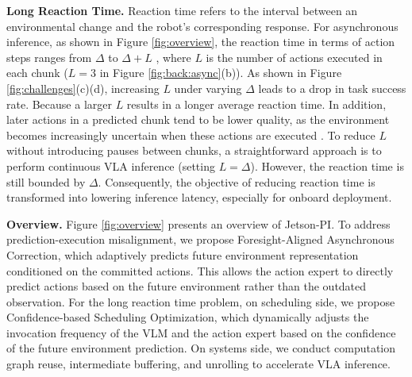 \textbf{Long Reaction Time.}
Reaction time refers to the interval between an environmental change and the robot's corresponding response. For asynchronous inference, as shown in Figure \ref{fig:overview}, the reaction time in terms of action steps ranges from $\Delta$ to $\Delta+L$ \cite{lu2026faster,shi2026streamingvla}, where 
$L$ is the number of actions executed in each chunk ($L=3$ in Figure \ref{fig:back:async}(b)). As shown in Figure \ref{fig:challenges}(c)(d), increasing $L$ under varying $\Delta$ leads to a drop in task success rate. Because a larger $L$ results in a longer average reaction time. 
In addition, later actions in a predicted chunk tend to be lower quality, as the environment becomes increasingly uncertain when these actions are executed \cite{lu2026faster}. 
To reduce $L$ without introducing pauses between chunks, a straightforward approach is to perform continuous VLA inference (setting $L=\Delta$). However, the reaction time is still bounded by $\Delta$. 
Consequently, the objective of reducing reaction time is transformed into lowering inference latency, especially for onboard deployment.



\textbf{Overview.} 
Figure \ref{fig:overview} presents an overview of Jetson-PI. To address prediction-execution misalignment, we propose Foresight-Aligned Asynchronous Correction, which adaptively predicts future environment representation conditioned on the committed actions. This allows the action expert to directly predict actions based on the future environment rather than the outdated observation.
For the long reaction time problem, on scheduling side, we propose Confidence-based Scheduling Optimization, which dynamically adjusts the invocation frequency of the VLM and the action expert based on the confidence of the future environment prediction.
On systems side, we conduct computation graph reuse, intermediate buffering, and unrolling to accelerate VLA inference.




